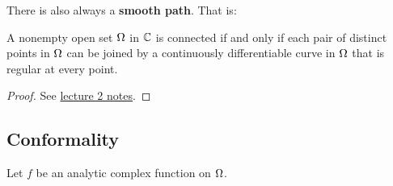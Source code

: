 \documentclass[12pt]{article}
\begin{document}
\rmk There is also always a \textbf{smooth path}. That is: 

\begin{theorem}
    A nonempty open set $\Omega$ in $\mathbb{C}$ is connected if and only if each pair of distinct
points in $\Omega$ can be joined by a continuously differentiable curve in $\Omega$ that is regular at
every point.
\end{theorem}
\begin{proof}
    See \href{https://stephangarcia.sites.pomona.edu/teaching/24S-135/Lecture/24S-135-Lecture02.pdf}{lecture 2 notes}.
\end{proof}

\subsection{Conformality}
Let $f$ be an analytic complex function on $\Omega$.
\end{document}
